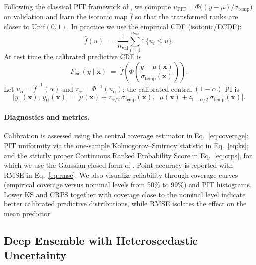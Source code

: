 \documentclass{article}
\begin{document}
Following the classical PIT framework of \citep{dawid1984present}, we compute $u_{\text{PIT}}=\Phi\!\big((y-\mu)/\sigma_{\text{temp}}\big)$ on validation and learn the isotonic map $\hat f$ so that the transformed ranks are closer to $\mathrm{Unif}(0,1)$\citep{zadrozny2002transforming,kuleshov2018}. 
In practice we use the empirical CDF (isotonic/ECDF):
\begin{equation}
\label{eq:ecdf-iso}
\hat{f}(u) \;=\; \frac{1}{n_{\mathrm{val}}}\sum_{i=1}^{n_{\mathrm{val}}}\mathbb{1}\{u_i\le u\}.
\end{equation}
At test time the calibrated predictive CDF is
\begin{equation}
\label{eq:cdf-calibrated}
F_{\text{cal}}(y\mid \mathbf{x}) \;=\; \hat{f}\!\left(\Phi\!\left(\frac{y-\mu(\mathbf{x})}{\sigma_{\text{temp}}(\mathbf{x})}\right)\right).
\end{equation}
Let $u_\alpha=\hat{f}^{-1}(\alpha)$ and $z_\alpha=\Phi^{-1}(u_\alpha)$; the calibrated central $(1-\alpha)$ PI is
\begin{equation}
\label{eq:pi-cal}
\big[y_{\text{L}}(\mathbf{x}),\,y_{\text{U}}(\mathbf{x})\big] =
\Big[\mu(\mathbf{x})+z_{\alpha/2}\,\sigma_{\text{temp}}(\mathbf{x}),\;\;
      \mu(\mathbf{x})+z_{1-\alpha/2}\,\sigma_{\text{temp}}(\mathbf{x})\Big].
\end{equation}

\paragraph{Diagnostics and metrics.}
Calibration is assessed using the central coverage estimator in Eq.~\ref{eq:coverage}; PIT uniformity via the one-sample Kolmogorov--Smirnov statistic \citep{massey1951kolmogorov} in Eq.~\ref{eq:ks}; and the strictly proper Continuous Ranked Probability Score in Eq.~\ref{eq:crps}, for which we use the Gaussian closed form of \citep{hersbach2000decomposition}. Point accuracy is reported with RMSE in Eq.~\ref{eq:rmse}. We also visualize reliability through coverage curves (empirical coverage versus nominal levels from 50\% to 99\%) and PIT histograms. Lower KS and CRPS together with coverage close to the nominal level indicate better calibrated predictive distributions, while RMSE isolates the effect on the mean predictor.




\subsection{Deep Ensemble with Heteroscedastic Uncertainty}
\label{sec:deep_ensemble_method}
\end{document}
